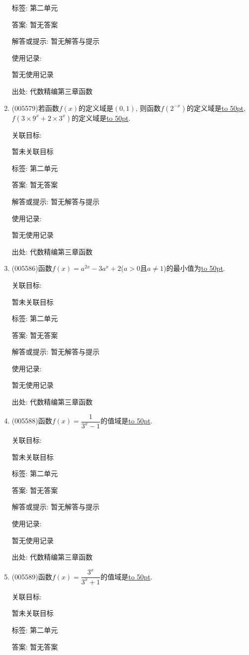 \documentclass[10pt,a4paper]{article}
\newcommand{\blank}[1]{\underline{\hbox to #1pt{}}}
\begin{document}
\begin{enumerate}[1.]
标签: 第二单元

答案: 暂无答案

解答或提示: 暂无解答与提示

使用记录:

暂无使用记录


出处: 代数精编第三章函数
\item { (005579)}若函数$f(x)$的定义域是$(0, 1)$, 则函数$f(2^{-x})$的定义域是\blank{50}, $f(3\times 9^x+2\times 3^x)$的定义域是\blank{50}.


关联目标:

暂未关联目标



标签: 第二单元

答案: 暂无答案

解答或提示: 暂无解答与提示

使用记录:

暂无使用记录


出处: 代数精编第三章函数
\item { (005586)}函数$f(x)=a^{2x}-3a^x+2$($a>0$且$a\ne 1$)的最小值为\blank{50}.


关联目标:

暂未关联目标



标签: 第二单元

答案: 暂无答案

解答或提示: 暂无解答与提示

使用记录:

暂无使用记录


出处: 代数精编第三章函数
\item { (005588)}函数$f(x)=\dfrac 1{3^x-1}$的值域是\blank{50}.


关联目标:

暂未关联目标



标签: 第二单元

答案: 暂无答案

解答或提示: 暂无解答与提示

使用记录:

暂无使用记录


出处: 代数精编第三章函数
\item { (005589)}函数$f(x)=\dfrac{3^x}{3^x+1}$的值域是\blank{50}.


关联目标:

暂未关联目标



标签: 第二单元

答案: 暂无答案


\end{enumerate}
\end{document}
